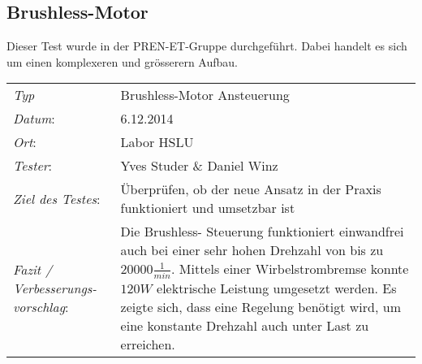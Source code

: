 \subsection{Brushless-Motor}
	Dieser Test wurde in der PREN-ET-Gruppe durchgeführt. Dabei handelt es sich um 
	einen komplexeren und grösserern Aufbau.\\

\begin{tabular}{p{3.6cm}p{\textwidth-3.6cm-0.7cm}}
\rule{0pt}{11pt}\textit{Typ}              & Brushless-Motor Ansteuerung \\ 
\rule{0pt}{11pt}\textit{Datum}:           & 6.12.2014   \\
\rule{0pt}{11pt}\textit{Ort}:             & Labor HSLU \\
\rule{0pt}{11pt}\textit{Tester}:          & Yves Studer \& Daniel Winz \\
\rule{0pt}{11pt}\textit{Ziel des Testes}: & Überprüfen, ob der neue Ansatz in der 
Praxis funktioniert und umsetzbar ist\\
\rule{0pt}{11pt}\textit{Fazit / Verbesserungs-\newline vorschlag}: & Die Brushless-
Steuerung funktioniert einwandfrei auch bei einer sehr hohen Drehzahl von bis zu 
$20000\frac{1}{min}$. Mittels einer Wirbelstrombremse konnte $120 W$ elektrische 
Leistung umgesetzt werden. Es zeigte sich, dass eine Regelung benötigt wird, um 
eine konstante Drehzahl auch unter Last zu erreichen.
\end{tabular}
    